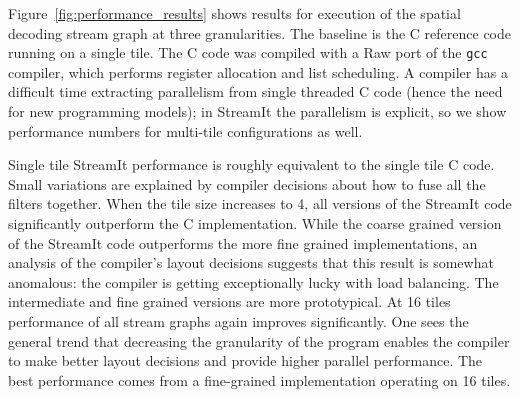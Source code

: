 Figure~\ref{fig:performance_results} shows results for execution of 
the spatial decoding stream graph at three granularities.
The baseline is
the C reference code running on a single tile. 
The C code was compiled with a Raw port of the \texttt{gcc} compiler,
which performs register allocation and list scheduling.
A compiler has a difficult time extracting parallelism from single threaded C code
(hence the need for new programming models); in StreamIt the parallelism
is explicit, so we show performance numbers for multi-tile 
configurations as well. 

Single tile StreamIt performance is roughly equivalent to the
single tile C code. Small variations are explained
by compiler decisions about how to fuse all the filters together. 
When the tile size increases to 4, all versions of the StreamIt
code significantly outperform the C implementation. While 
the coarse grained
version of the StreamIt code outperforms the more fine grained
implementations, an analysis of the compiler's layout decisions suggests
that this result is somewhat anomalous: the compiler is 
getting exceptionally lucky with load balancing. The intermediate
and fine grained versions are more prototypical.
At 16 tiles performance of all stream graphs 
again improves significantly. One 
sees the general trend that decreasing the granularity of
the program enables the compiler to make better layout
decisions and provide higher parallel performance. The best 
performance comes from a fine-grained implementation 
operating on 16 tiles.

